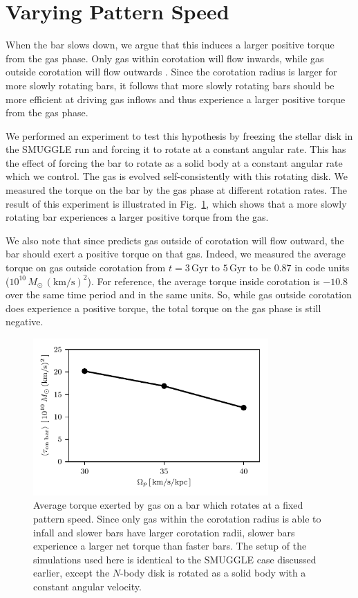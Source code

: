 \documentclass[twocolumn,linenumbers,trackchanges]{aastex631}
\newcommand{\Nbody}{$N$-body}
\newcommand{\SMUGGLE}{SMUGGLE}
\begin{document}
\section{Varying Pattern Speed}
\label{app:varyps}
When the bar slows down, we argue that this induces a larger positive torque
from the gas phase. Only gas within corotation will flow inwards, while gas
outside corotation will flow outwards \citep{2011MNRAS.415.1027H}. Since the
corotation radius is larger for more slowly rotating bars, it follows that
more slowly rotating bars should be more efficient at driving gas inflows and
thus experience a larger positive torque from the gas phase.

We performed an experiment to test this hypothesis by freezing the stellar
disk in the \SMUGGLE{} run and forcing it to rotate at a constant angular rate.
This has the effect of forcing the bar to rotate as a solid body at a constant
angular rate which we control. The gas is evolved self-consistently with this
rotating disk. We measured the torque on the bar by the gas phase at different
rotation rates. The result of this experiment is illustrated in
Fig.~\ref{fig:equil}, which shows that a more slowly rotating bar experiences a
larger positive torque from the gas.

We also note that since \citet{2011MNRAS.415.1027H} predicts gas outside of
corotation will flow outward, the bar should exert a positive torque on that
gas. Indeed, we measured the average torque on gas outside corotation from
$t=3\,\textrm{Gyr}$ to $5\,\textrm{Gyr}$ to be $0.87$ in code units
($10^{10}\,M_{\odot}\,(\text{km}/\text{s})^2$). For reference, the average
torque inside corotation is $-10.8$ over the same time period and in the same
units. So, while gas outside corotation does experience a positive torque, the
total torque on the gas phase is still negative.

\begin{figure}
    \centering
    \includegraphics[width=9cm]{fig/torque_ps.pdf}
    \caption{Average torque exerted by gas on a bar which rotates at a fixed
    pattern speed. Since only gas within the corotation radius is able to infall
    and slower bars have larger corotation radii, slower bars experience a
    larger net torque than faster bars. The setup of the simulations used here
    is identical to the \SMUGGLE{} case discussed earlier, except the \Nbody{} disk
    is rotated as a solid body with a constant angular
    velocity.}
    \label{fig:equil}
\end{figure}
\end{document}

